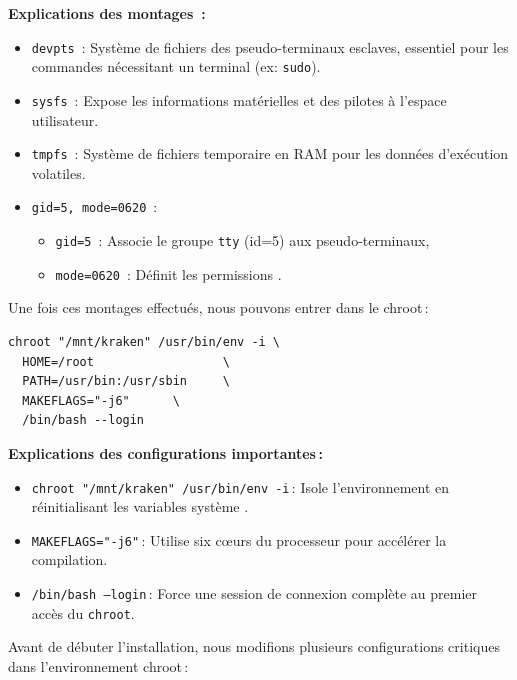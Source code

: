 \textbf{Explications des montages~:}
\begin{itemize}
  \item \texttt{devpts}~: 
        Système de fichiers des pseudo-terminaux esclaves, essentiel pour les commandes nécessitant un terminal (ex: \texttt{sudo}).
        
  \item \texttt{sysfs}~: 
        Expose les informations matérielles et des pilotes à l’espace utilisateur.
        
  \item \texttt{tmpfs}~: 
        Système de fichiers temporaire en RAM pour les données d’exécution volatiles.
        
  \item \texttt{gid=5, mode=0620}~: 
        \begin{itemize}
          \item \texttt{gid=5}~: Associe le groupe \texttt{tty} (id=5) aux pseudo-terminaux,
          \item \texttt{mode=0620}~: Définit les permissions .
        \end{itemize}
\end{itemize}
\noindent
Une fois ces montages effectués, nous pouvons entrer dans le chroot :

\begin{verbatim}
chroot "/mnt/kraken" /usr/bin/env -i \
  HOME=/root                  \
  PATH=/usr/bin:/usr/sbin     \
  MAKEFLAGS="-j6"      \
  /bin/bash --login
\end{verbatim}
\textbf{Explications des configurations importantes :}
\begin{itemize}
  \item \texttt{chroot "/mnt/kraken" /usr/bin/env -i} :  
        Isole l’environnement en réinitialisant les variables système .



  \item \texttt{MAKEFLAGS="-j6"} :  
        Utilise six cœurs du processeur  pour accélérer la compilation.

  \item \texttt{/bin/bash --login} :  
        Force une session de connexion complète au premier accès du \texttt{chroot}.
\end{itemize}

Avant de débuter l’installation, nous modifions plusieurs configurations critiques dans l’environnement chroot :

